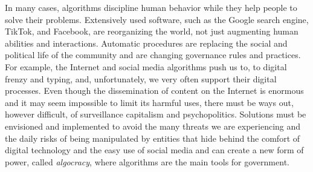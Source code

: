 In many cases, algorithms discipline human behavior while they help people to solve their problems. Extensively used software, such as the Google search engine, TikTok, and Facebook, are reorganizing the world, not just augmenting human abilities and interactions. Automatic procedures are replacing the social and political life of the community and are changing governance rules and practices. For example, the Internet and social media algorithms push us to, to digital frenzy and typing, and, unfortunately, we very often support their digital processes. Even though the dissemination of content on the Internet is enormous and it may seem impossible to limit its harmful uses, there must be ways out, however difficult, of surveillance capitalism and psychopolitics. Solutions must be envisioned and implemented to avoid the many threats we are experiencing and the daily risks of being manipulated by entities that hide behind the comfort of digital technology and the easy use of social media and can create a new form of power, called \textit{algocracy}, where algorithms are the main tools for government.



